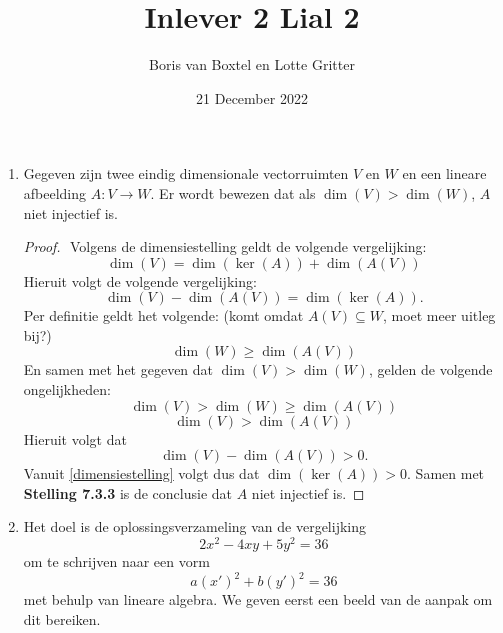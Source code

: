\documentclass[12pt, dutch, a4paper]{article}
\title{Inlever 2 Lial 2}
\author{Boris van Boxtel en Lotte Gritter}
\date{21 December 2022}
\theoremstyle{definition}
\begin{document}
\maketitle 

\begin{enumerate}
    \item \label{opdracht1}
    Gegeven zijn twee eindig dimensionale vectorruimten 
    $V$ en $W$ en een lineare afbeelding $A\colon V \to W$. 
    Er wordt bewezen dat als $\dim(V) > \dim(W)$, $A$ niet injectief is.
    
    \begin{proof} $ $ \newline
        Volgens de dimensiestelling geldt de volgende vergelijking:
        \begin{equation}
            \dim(V) = \dim(\ker(A)) + \dim(A(V))
        \end{equation}
        Hieruit volgt de volgende vergelijking:
        \begin{equation} \label{dimensiestelling}
            \dim(V) - \dim(A(V)) = \dim(\ker(A)).
        \end{equation}
        Per definitie geldt het volgende: 
        (komt omdat $A(V) \subseteq W$, moet meer uitleg bij?)
        \begin{equation}
            \dim(W) \geq \dim(A(V))
        \end{equation}
        En samen met het gegeven dat $\dim(V) > \dim(W)$,
        gelden de volgende ongelijkheden:
        \begin{equation}
            \dim(V) > \dim(W) \geq \dim(A(V))
        \end{equation}
        \begin{equation}
            \dim(V) > \dim(A(V))
        \end{equation}
        Hieruit volgt dat
        \begin{equation}
            \dim(V) - \dim(A(V)) > 0.
        \end{equation}
        Vanuit \cref{dimensiestelling} volgt dus dat $\dim(\ker(A)) > 0$.
        Samen met \textbf{Stelling 7.3.3} 
        is de conclusie dat $A$ niet injectief is. 

    \end{proof}
    
    \item \label{opdracht2}
    Het doel is de oplossingsverzameling van de vergelijking
    \begin{equation}\label{maineq}
        2x^2 - 4xy + 5y^2 = 36
    \end{equation}
    om te schrijven naar een vorm 
    \begin{equation}
        a(x')^2 + b(y')^2 = 36
    \end{equation}
    met behulp van lineare algebra. We geven eerst een beeld van de aanpak om dit bereiken. 
    

\end{enumerate}
\end{document}
